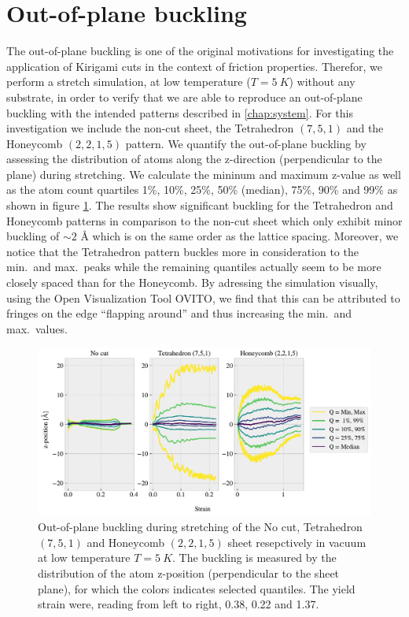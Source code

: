 \section{Out-of-plane buckling}
The out-of-plane buckling is one of the original motivations for investigating
the application of Kirigami cuts in the context of friction properties. Therefor, we perform a stretch simulation, at low temperature ($T = \SI{5}{K}$) without any substrate, in order to verify that we are able to reproduce an out-of-plane buckling with the
intended patterns described in \cref{chap:system}. For this investigation we include the non-cut sheet, the Tetrahedron $(7,5,1)$ and the Honeycomb $(2,2,1,5)$ pattern. We quantify the out-of-plane buckling by assessing the distribution of atoms along the z-direction (perpendicular to the plane) during stretching. We calculate the
mininum and maximum z-value as well as the atom count quartiles 1\%, 10\%, 25\%, 50\%
(median), 75\%, 90\% and 99\% as shown in figure \cref{fig:buckling_quartiles}. The results show significant buckling for the Tetrahedron and Honeycomb patterns in comparison to the non-cut sheet which only exhibit minor
buckling of $\sim 2$ Å which is on the same order as the lattice spacing.
Moreover, we notice that the Tetrahedron pattern buckles more in consideration
to the min.\ and max.\ peaks while the remaining quantiles actually seem to be more closely spaced than for the Honeycomb. By adressing the simulation visually, using the Open Visualization Tool OVITO, we find that this can be
attributed to fringes on the edge ``flapping around'' and thus increasing the
min.\ and max.\ values.

\begin{figure}[H]
  \centering
  \includegraphics[width=\linewidth]{figures/baseline/vacuum_normal_buckling}
  \caption{Out-of-plane buckling during stretching of the No cut, Tetrahedron $(7,5,1)$ and Honeycomb $(2,2,1,5)$ sheet resepctively in vacuum at low temperature $T = \SI{5}{K}$. The buckling is measured by the distribution of the atom z-position (perpendicular to the sheet plane), for which the colors indicates selected quantiles. The yield strain were, reading from left to right, 0.38, 0.22 and 1.37.}
  \label{fig:buckling_quartiles}
\end{figure}

